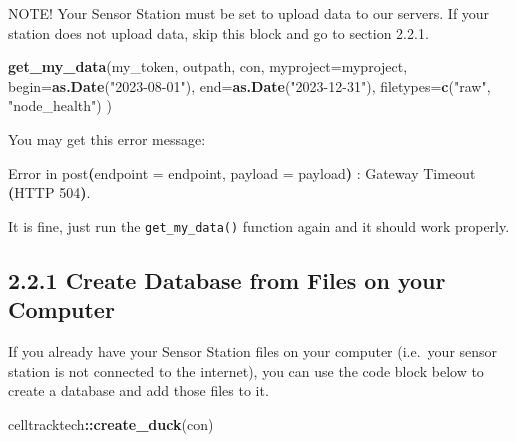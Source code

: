 \documentclass[
]{book}
\newenvironment{Shaded}{\begin{snugshade}}{\end{snugshade}}
\newcommand{\AttributeTok}[1]{\textcolor[rgb]{0.13,0.29,0.53}{#1}}
\newcommand{\BuiltInTok}[1]{#1}
\newcommand{\ErrorTok}[1]{\textcolor[rgb]{0.64,0.00,0.00}{\textbf{#1}}}
\newcommand{\ExtensionTok}[1]{#1}
\newcommand{\FunctionTok}[1]{\textcolor[rgb]{0.13,0.29,0.53}{\textbf{#1}}}
\newcommand{\KeywordTok}[1]{\textcolor[rgb]{0.13,0.29,0.53}{\textbf{#1}}}
\newcommand{\NormalTok}[1]{#1}
\newcommand{\SpecialCharTok}[1]{\textcolor[rgb]{0.81,0.36,0.00}{\textbf{#1}}}
\newcommand{\StringTok}[1]{\textcolor[rgb]{0.31,0.60,0.02}{#1}}
\begin{document}
NOTE! Your Sensor Station must be set to upload data to our servers. If your station does not upload data, skip this block and go to section 2.2.1.

\begin{Shaded}
\begin{Highlighting}[]
\FunctionTok{get\_my\_data}\NormalTok{(my\_token,}
\NormalTok{            outpath, }
\NormalTok{            con, }
            \AttributeTok{myproject=}\NormalTok{myproject,}
            \AttributeTok{begin=}\FunctionTok{as.Date}\NormalTok{(}\StringTok{"2023{-}08{-}01"}\NormalTok{),}
            \AttributeTok{end=}\FunctionTok{as.Date}\NormalTok{(}\StringTok{"2023{-}12{-}31"}\NormalTok{),}
            \AttributeTok{filetypes=}\FunctionTok{c}\NormalTok{(}\StringTok{"raw"}\NormalTok{, }\StringTok{"node\_health"}\NormalTok{)}
\NormalTok{)}
\end{Highlighting}
\end{Shaded}

You may get this error message:

\begin{Shaded}
\begin{Highlighting}[]
\ExtensionTok{Error}\NormalTok{ in post}\ErrorTok{(}\ExtensionTok{endpoint}\NormalTok{ = endpoint, payload = payload}\KeywordTok{)} \BuiltInTok{:} 
  \ExtensionTok{Gateway}\NormalTok{ Timeout }\ErrorTok{(}\ExtensionTok{HTTP}\NormalTok{ 504}\KeywordTok{)}\BuiltInTok{.}
\end{Highlighting}
\end{Shaded}

It is fine, just run the \texttt{get\_my\_data()} function again and it should work properly.

\subsection{2.2.1 Create Database from Files on your Computer}\label{create-database-from-files-on-your-computer}

If you already have your Sensor Station files on your computer (i.e.~your sensor station is not connected to the internet), you can use the code block below to create a database and add those files to it.

\begin{Shaded}
\begin{Highlighting}[]
\NormalTok{celltracktech}\SpecialCharTok{::}\FunctionTok{create\_duck}\NormalTok{(con)}
\end{Highlighting}
\end{Shaded}
\end{document}
